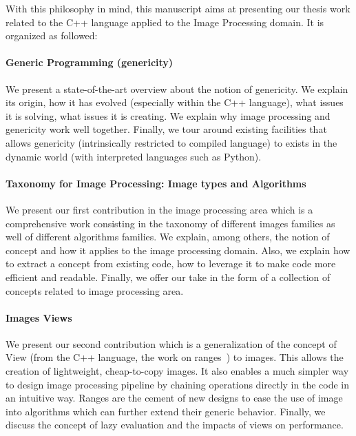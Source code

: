 With this philosophy in mind, this manuscript aims at presenting our thesis work related to the C++ language applied to
the Image Processing domain. It is organized as followed:

\paragraph{Generic Programming (genericity)} We present a state-of-the-art overview about the notion of
genericity. We explain its origin, how it has evolved (especially within the C++ language), what issues it is solving,
what issues it is creating. We explain why image processing and genericity work well together. Finally, we tour around
existing facilities that allows genericity (intrinsically restricted to compiled language) to exists in the dynamic
world (with interpreted languages such as Python).

\paragraph{Taxonomy for Image Processing: Image types and Algorithms} We present our first contribution in the image
processing area which is a comprehensive work consisting in the taxonomy of different images families as well of
different algorithms families. We explain, among others, the notion of concept and how it applies to the image
processing domain. Also, we explain how to extract a concept from existing code, how to leverage it to make code more
efficient and readable. Finally, we offer our take in the form of a collection of concepts related to image processing
area.

\paragraph{Images Views} We present our second contribution which is a generalization of the concept of View
(from the C++ language, the work on ranges~\parencite{niebler.2018.ranges}) to images. This allows the creation of
lightweight, cheap-to-copy images. It also enables a much simpler way to design image processing pipeline by chaining
operations directly in the code in an intuitive way. Ranges are the cement of new designs to ease the use of image into
algorithms which can further extend their generic behavior. Finally, we discuss the concept of lazy evaluation and the
impacts of views on performance.

